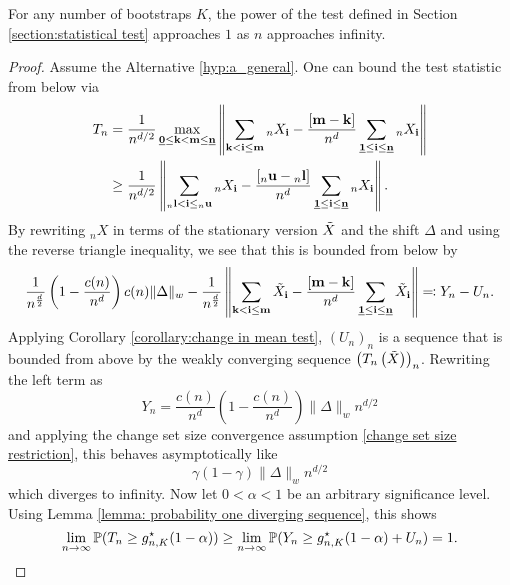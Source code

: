 \begin{corollary} \label{statistical power of the test}
    For any number of bootstraps $K$, the power of the test defined in Section \ref{section:statistical test} approaches $1$ as $n$ approaches infinity.
\end{corollary}
\begin{proof}
    Assume the Alternative \ref{hyp:a_general}. One can bound the test statistic from below via
    \begin{align*}
        T_n
        &= \frac{1}{n^{d/2}} \max\limits_{\usbf[0] \leq \mathbf{k} < \mathbf{m} \leq \usbf[n]} \left\| \sum\limits_{\mathbf{k} < \mathbf{i} \leq \mathbf{m}} {}_{n}X_\mathbf{i} - \frac{[\mathbf{m}-\mathbf{k}]}{n^d} \sum\limits_{\usbf[1] \leq \mathbf{i} \leq \usbf[n]} {}_{n}X_\mathbf{i} \right\| \\
        & \geq \frac{1}{n^{d/2}} \left\| \sum\limits_{{}_{n}\mathbf{l} < \mathbf{i} \leq {}_{n}\mathbf{u}} {}_{n}X_\mathbf{i} - \frac{[{}_{n}\mathbf{u}-{}_{n}\mathbf{l}]}{n^d} \sum\limits_{\usbf[1] \leq \mathbf{i} \leq \usbf[n]} {}_{n}X_\mathbf{i} \right\|.
    \end{align*}
    By rewriting ${}_{n}X$ in terms of the stationary version $\Tilde{X}$ and the shift $\Delta$ and using the reverse triangle inequality, we see that this is bounded from below by
    \begin{align*}
        \frac{1}{n^{\frac{d}{2}}} \left(1 - \frac{c(n)}{n^d}\right) c(n) \| \Delta \|_w - \frac{1}{n^{\frac{d}{2}}} \left\| \sum\limits_{\mathbf{k} < \mathbf{i} \leq \mathbf{m}} \Tilde{X}_\mathbf{i} - \frac{[\mathbf{m}-\mathbf{k}]}{n^d} \sum\limits_{\usbf[1] \leq \mathbf{i} \leq \usbf[n]} \Tilde{X}_\mathbf{i} \right\| \eqqcolon Y_n - U_n.
    \end{align*}
    Ap\-ply\-ing Corol\-lary \ref{corollary:change in mean test}, $(U_n)_n$ is a sequence that is bounded from above by the weakly converging sequence $\left(T_n\left(\Tilde{X}\right)\right)_n$. Rewriting the left term as 
    \[ Y_n = \frac{c(n)}{n^d} \left(1 - \frac{c(n)}{n^d}\right) \| \Delta \|_w n^{d/2} \]
    and applying the change set size convergence assumption \eqref{change set size restriction}, this behaves asymptotically like
    \begin{equation} \label{asymptotic lower bound Tn}
        \gamma (1 - \gamma) \| \Delta \|_w n^{d/2}
    \end{equation}
    which diverges to infinity. Now let $0 < \alpha < 1$ be an arbitrary significance level. Using Lemma \ref{lemma: probability one diverging sequence}, this shows
    \[ \lim\limits_{n \to \infty} \mathbb{P}(T_n \geq g_{n, K}^\star(1-\alpha)) \geq \lim\limits_{n \to \infty} \mathbb{P}(Y_n \geq g_{n, K}^\star(1-\alpha) + U_n) = 1. \]
\end{proof}

